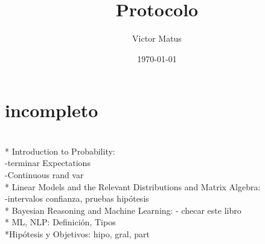 \documentclass[letterpaper]{article}
\author{Victor Matus}
\title{Protocolo}
\date{\today}
\begin{document}
\tableofcontents
\section {incompleto}\ \\
* Introduction to Probability:\\
-terminar Expectations\\
-Continuous rand var\\
* Linear Models and the Relevant Distributions and Matrix Algebra:\\
-intervalos confianza, pruebas hipótesis\\
* Bayesian Reasoning and Machine Learning: - checar este libro\\
* ML, NLP: Definición, Tipos\\
*Hipótesis y Objetivos: hipo, gral, part
\pagebreak
\end{document}
